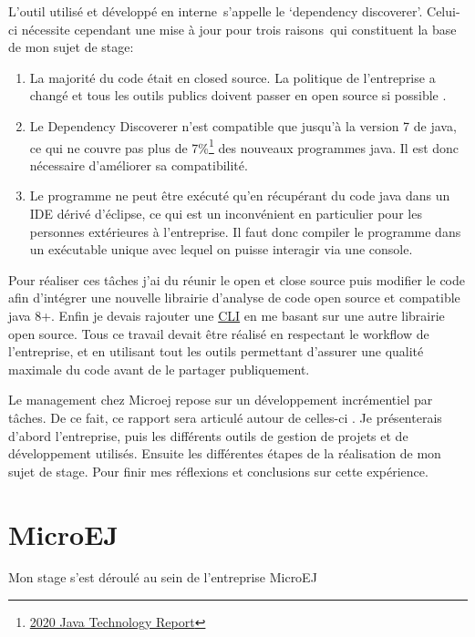 \documentclass[french,a4paper,12pt]{report}
\begin{document}
L’outil utilisé et développé en interne s’appelle le ‘dependency discoverer’. Celui-ci nécessite cependant une mise à jour pour trois raisons qui constituent la base de mon sujet de stage:

\begin{enumerate}
\item  La majorité du code était en closed source. La politique de l’entreprise a changé et tous les outils publics doivent passer en open source si possible .
\item Le Dependency Discoverer n’est compatible que jusqu’à la version 7 de java, ce qui ne couvre pas plus de 7\%\footnote{\href{https://www.jrebel.com/blog/2020-java-technology-report}{2020 Java Technology Report}} des nouveaux programmes java. Il est donc nécessaire d’améliorer sa compatibilité. 
\item  Le programme ne peut être exécuté qu’en récupérant du code java dans un IDE dérivé d’éclipse, ce qui est un inconvénient en particulier pour les personnes extérieures à l’entreprise. Il faut donc compiler le programme dans un exécutable unique avec lequel on puisse interagir via une console.
\end{enumerate}

Pour réaliser ces tâches j’ai du réunir le open et close source puis modifier le code afin d’intégrer une nouvelle librairie d’analyse de code open source et compatible java 8+. Enfin je devais rajouter une \hyperlink{CLI}{CLI} en me basant sur une autre librairie open source.
Tous ce travail devait être réalisé en respectant le workflow de l’entreprise, et en utilisant tout les outils permettant d’assurer une qualité maximale du code avant de le partager publiquement.

Le management chez Microej repose sur un développement incrémentiel par tâches. De ce fait, ce rapport sera articulé autour de celles-ci . Je présenterais d’abord l’entreprise, puis les différents outils de gestion de projets et de développement utilisés. Ensuite les différentes étapes de la réalisation de mon sujet de stage. Pour finir mes réflexions et conclusions sur cette expérience. 

\chapter{MicroEJ}

Mon stage s’est déroulé au sein de l’entreprise MicroEJ 

\bigskip
\end{document}
